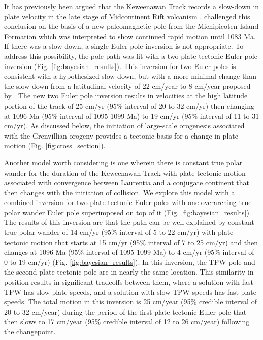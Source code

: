 \documentclass[11pt,letterpaper]{article}
\begin{document}
It has previously been argued that the Keweenawan Track records a slow-down in plate velocity in the late stage of Midcontinent Rift volcanism \citep{Davis1997a,Swanson-Hysell2009a}. \cite{Fairchild2017a} challenged this conclusion on the basis of a new paleomagnetic pole from the Michipicoten Island Formation which was interpreted to show continued rapid motion until 1083 Ma. If there was a slow-down, a single Euler pole inversion is not appropriate. To address this possibility, the pole path was fit with a two plate tectonic Euler pole inversion (Fig. \ref{fig:bayesian_results}). This inversion for two Euler poles is consistent with a hypothesized slow-down, but with a more minimal change than the slow-down from a latitudinal velocity of 22 cm/year to 8 cm/year proposed by \citet{Davis1997a}. The new two Euler pole inversion results in velocities at the high latitude portion of the track of 25 cm/yr (95$\%$ interval of 20 to 32 cm/yr) then changing at 1096 Ma (95\% interval of 1095-1099 Ma) to 19 cm/yr (95$\%$ interval of 11 to 31 cm/yr). As discussed below, the initiation of large-scale orogenesis associated with the Grenvillian orogeny provides a tectonic basis for a change in plate motion (Fig. \ref{fig:cross_section}).

Another model worth considering is one wherein there is constant true polar wander for the duration of the Keweenawan Track with plate tectonic motion associated with convergence between Laurentia and a conjugate continent that then changes with the initiation of collision. We explore this model with a combined inversion for two plate tectonic Euler poles with one overarching true polar wander Euler pole superimposed on top of it (Fig. \ref{fig:bayesian_results}). The results of this inversion are that the path can be well-explained by constant true polar wander of 14 cm/yr (95$\%$ interval of 5 to 22 cm/yr) with plate tectonic motion that starts at 15 cm/yr (95$\%$ interval of 7 to 25 cm/yr) and then changes at 1096 Ma (95\% interval of 1095-1099 Ma) to 4 cm/yr (95$\%$ interval of 0 to 19 cm/yr) (Fig. \ref{fig:bayesian_results}). In this inversion, the TPW pole and the second plate tectonic pole are in nearly the same location. This similarity in position results in significant tradeoffs between them, where a solution with fast TPW has slow plate speeds, and a solution with slow TPW speeds has fast plate speeds. The total motion in this inversion is 25 cm/year (95$\%$ credible interval of 20 to 32 cm/year) during the period of the first plate tectonic Euler pole that then slows to 17 cm/year (95$\%$ credible interval of 12 to 26 cm/year) following the changepoint.
\end{document}
